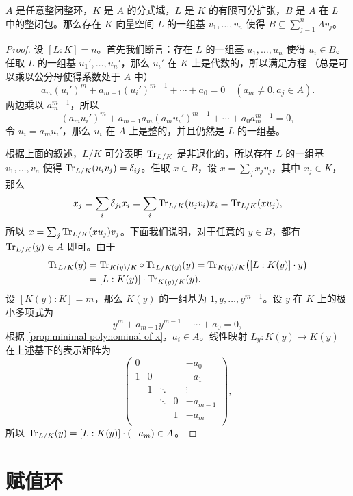 \begin{proposition}\label{prop:basis of integral closure}
  $A$ 是任意整闭整环，$K$ 是 $A$ 的分式域，$L$ 是 $K$ 的有限可分扩张，$B$ 是 $A$ 
  在 $L$ 中的整闭包。那么存在 $K$-向量空间 $L$ 的一组基 $v_1,\dots,v_n$
  使得 $B\subseteq \sum_{j=1}^n Av_j$。
\end{proposition}
\begin{proof}
  设 $[L:K]=n$。首先我们断言：存在 $L$ 的一组基 $u_1,\dots,u_n$ 使得 $u_i\in B$。
  任取 $L$ 的一组基 $u_1',\dots,u_n'$，那么 $u_i'$ 在 $K$ 上是代数的，所以满足方程
  （总是可以乘以公分母使得系数处于 $A$ 中）
  \[
    a_m(u_i')^m+a_{m-1}(u_i')^{m-1}+\cdots+  a_0=0\quad (a_m\neq 0, a_j\in A).
  \]
  两边乘以 $a_m^{m-1}$，所以
  \[
    (a_mu_i')^m+a_{m-1}a_m(a_mu_i')^{m-1}+\cdots+a_0 a_m^{m-1}=0,  
  \]
  令 $u_i=a_mu_i'$，那么 $u_i$ 在 $A$ 上是整的，并且仍然是 $L$ 的一组基。

  根据上面的叙述，$L/K$ 可分表明 $\operatorname{Tr}_{L/K}$ 是非退化的，所以存在 $L$ 的一组基 $v_1,\dots,v_n$
  使得 $\operatorname{Tr}_{L/K}(u_iv_j)=\delta_{ij}$。任取 $x\in B$，设 $x=\sum_j x_jv_j$，其中 $x_j\in K$，
  那么
  \[
    x_j=\sum_i\delta_{ji}x_i=\sum_i\operatorname{Tr}_{L/K}(u_jv_i)x_i
    =\operatorname{Tr}_{L/K}(xu_j),
  \]
  所以 $x=\sum_j \operatorname{Tr}_{L/K}(xu_j)v_j$。下面我们说明，对于任意的 $y\in B$，都有
  $\operatorname{Tr}_{L/K}(y)\in A$ 即可。由于
  \begin{align*}
    \operatorname{Tr}_{L/K}(y)&=\operatorname{Tr}_{K(y)/K}\circ \operatorname{Tr}_{L/K(y)}(y)=\operatorname{Tr}_{K(y)/K}\bigl([L:K(y)]\cdot y\bigr)\\
    &=[L:K(y)]\cdot \operatorname{Tr}_{K(y)/K}(y).
  \end{align*}
  设 $[K(y):K]=m$，那么 $K(y)$ 的一组基为 $1,y,\dots,y^{m-1}$。设 $y$ 在 $K$
  上的极小多项式为
  \[
    y^m+a_{m-1}  y^{m-1}+\cdots+a_0=0,
  \]
  根据 \autoref{prop:minimal polynominal of x}，$a_i\in A$。线性映射 $L_y:K(y)\to K(y)$
  在上述基下的表示矩阵为
  \[
    \begin{pmatrix*}
      0 & & & & -a_0\\
      1 & 0 & && -a_1\\
      & 1 & \ddots & & \vdots\\
      & & \ddots& 0 &-a_{m-1}\\
      & & & 1 & -a_m\\
    \end{pmatrix*}  ,
  \]
  所以 $\operatorname{Tr}_{L/K}(y)=[L:K(y)]\cdot (-a_{m})\in A$。
\end{proof}

\section{赋值环}

